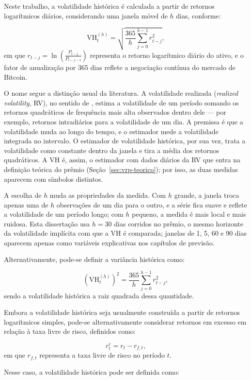 Neste trabalho, a volatilidade histórica é calculada a partir de retornos
logarítmicos diários, considerando uma janela móvel de \(h\) dias, conforme:

\[
\text{VH}_t^{(h)} = \sqrt{ \frac{365}{h} \sum_{j=0}^{h-1} r_{t-j}^2 },
\]
em que \(r_{t-j} = \ln\left(\frac{P_{t-j}}{P_{t-j-1}}\right)\) representa o retorno
logarítmico diário do ativo, e o fator de anualização por 365 dias reflete a
negociação contínua do mercado de Bitcoin.

O nome segue a distinção usual da literatura. A volatilidade realizada
(\textit{realized volatility}, RV), no sentido de \citet{andersen2003realized},
estima a volatilidade de um período somando os retornos quadráticos de
frequência mais alta observados dentro dele --- por exemplo, retornos
intradiários para a volatilidade de um dia. A premissa é que a volatilidade
muda ao longo do tempo, e o estimador mede a volatilidade integrada no
intervalo. O estimador de volatilidade histórica, por sua vez, trata a
volatilidade como constante dentro da janela e tira a média dos retornos
quadráticos. A VH é, assim, o estimador com dados diários da RV que entra na
definição teórica do prêmio (Seção~\ref{sec:vrp-teorico}); por isso, as duas
medidas aparecem com símbolos distintos.

A escolha de \(h\) muda as propriedades da medida. Com \(h\) grande, a janela
troca apenas uma de \(h\) observações de um dia para o outro, e a série fica
suave e reflete a volatilidade de um período longo; com \(h\) pequeno, a medida
é mais local e mais ruidosa. Esta dissertação usa \(h = 30\) dias corridos no
prêmio, o mesmo horizonte da volatilidade implícita com que a VH é comparada;
janelas de 1, 5, 60 e 90 dias aparecem apenas como variáveis explicativas nos
capítulos de previsão.

Alternativamente, pode-se definir a variância histórica como:

\[
\left(\text{VH}_t^{(h)}\right)^2 = \frac{365}{h} \sum_{j=0}^{h-1} r_{t-j}^2,
\]
sendo a volatilidade histórica a raiz quadrada dessa quantidade.

Embora a volatilidade histórica seja usualmente construída a partir de retornos
logarítmicos simples, pode-se alternativamente considerar retornos em excesso
em relação à taxa livre de risco, definidos como:

\[
r_t^e = r_t - r_{f,t},
\]
em que \(r_{f,t}\) representa a taxa livre de risco no período \(t\).

Nesse caso, a volatilidade histórica pode ser definida como:

